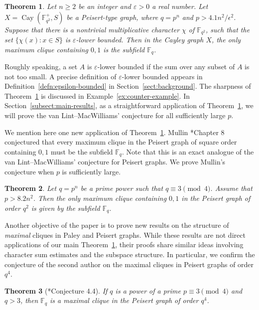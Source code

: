 \documentclass[12pt,reqno]{amsart}
\newtheorem{thm}{Theorem}[section]
\theoremstyle{definition}
\newcommand{\F}{\mathbb{F}}
\begin{document}
\begin{thm}\label{subfieldthm}
Let $n \geq 2$ be an integer and $\varepsilon>0$ a real number. Let $X=\operatorname{Cay}(\F_{q^2}^+, S)$ be a Peisert-type graph, where $q=p^n$ and $p>4.1n^2/\epsilon^2$. Suppose that there is a nontrivial multiplicative character $\chi$ of $\F_{q^2}$, such that the set $\{\chi(x): x \in S\}$ is $\varepsilon$-lower bounded. Then in the Cayley graph $X$, the only maximum clique containing $0,1$ is the subfield $\F_q$.
\end{thm} 

Roughly speaking, a set $A$ is $\varepsilon$-lower bounded if the sum over any subset of $A$ is not too small. A precise definition of $\varepsilon$-lower bounded appears in Definition~\ref{defn:epsilon-bounded} in Section~\ref{sect:background}. The sharpness of Theorem~\ref{subfieldthm} is discussed in Example~\ref{ex:counter-example}. In Section~\ref{subsect:main-results}, as a straightforward application of Theorem~\ref{subfieldthm}, we will prove the van Lint--MacWilliams' conjecture for all sufficiently large $p$. 

We mention here one new application of Theorem~\ref{subfieldthm}. Mullin \cite{NM}*{Chapter 8} conjectured that every maximum clique in the Peisert graph of square order containing $0, 1$ must be the subfield $\F_q$. Note that this is an exact analogue of the van Lint--MacWilliams' conjecture for Peisert graphs. We prove Mullin's conjecture when $p$ is sufficiently large.

\begin{thm}\label{conjP*forlargep}
Let $q=p^n$ be a prime power such that $q\equiv 3 \pmod 4$. Assume that $p>8.2n^2$. Then the only maximum clique containing $0,1$ in the Peisert graph of order $q^2$ is given by the subfield $\F_q$.
\end{thm}

Another objective of the paper is to prove new results on the structure of \emph{maximal} cliques in Paley and Peisert graphs. While these results are not direct applications of our main Theorem~\ref{subfieldthm}, their proofs share similar ideas involving character sum estimates and the subspace structure. In particular, we confirm the conjecture of the second author on the maximal cliques in Peisert graphs of order $q^4$. 

\begin{thm}[\cite{Yip3}*{Conjecture 4.4}]\label{conjmaxc}
If $q$ is a power of a prime $p \equiv 3 \pmod 4$  and $q>3$, then $\F_{q}$ is a maximal clique in the Peisert graph of order $q^4$.
\end{thm}
\end{document}
